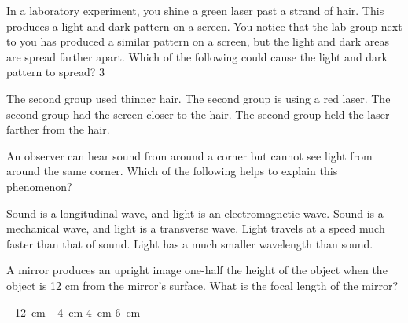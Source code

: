 \documentclass{../../../oss-ap12ibhl}
\begin{document}
\genheader


\begin{questions}
  \question In a laboratory experiment, you shine a green laser past a strand of
  hair. This produces a light and dark pattern on a screen. You notice that
  the lab group next to you has produced a similar pattern on a screen, but
  the light and dark areas are spread farther apart. Which of the following
  could cause the light and dark pattern to spread? 3
  \begin{choices}
    \choice The second group used thinner hair.
    \choice The second group is using a red laser.
    \choice The second group had the screen closer to the hair.
    \choice The second group held the laser farther from the hair.
  \end{choices}
  \vspace{.7in}
    
  \question An observer can hear sound from around a corner but cannot see light
  from around the same corner. Which of the following helps to explain this
  phenomenon?
  \begin{choices}
    \choice Sound is a longitudinal wave, and light is an electromagnetic wave.
    \choice Sound is a mechanical wave, and light is a transverse wave.
    \choice Light travels at a speed much faster than that of sound.
    \choice Light has a much smaller wavelength than sound.
  \end{choices}
  \vspace{.7in}
    
  \question A mirror produces an upright image one-half the height of the object
  when the object is 12 cm from the mirror's surface. What is the focal
  length of the mirror?
  \begin{choices}
    \choice\SI{-12}{\centi\metre}
    \choice\SI{-4}{\centi\metre}
    \choice\SI{4}{\centi\metre}
    \choice\SI{6}{\centi\metre}
  \end{choices}


\end{questions}
\end{document}
